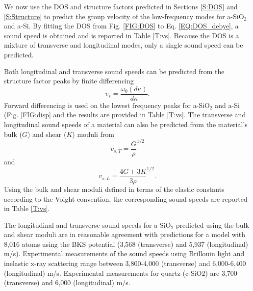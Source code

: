 \documentclass[aps,prb,onecolumn,preprint,superscriptaddress,footinbib,amsmath,amssymb,floatfix]{revtex4}
\begin{document}
We now use the DOS and structure factors predicted in 
Sections \ref{S:DOS} and \ref{S:Structure} to 
predict the group velocity of the low-frequency modes for 
a-SiO$_2$ and a-Si. By fitting the DOS 
from Fig. \ref{FIG:DOS} to Eq. \eqref{EQ:DOS_debye}, 
a sound speed is obtained and is  
reported in Table \ref{T:vs}. Because the DOS is a mixture of 
transverse and longitudinal modes, only a single sound speed can be 
predicted. 

Both longitudinal and transverse sound speeds can be predicted from 
the structure factor peaks by finite 
differencing 
\begin{equation}\label{EQ:vs_dwdk}
v_{s} = \frac{\omega_0(d\kappa)}{d\kappa}.
\end{equation}
Forward differencing is used on the lowest frequency peaks for a-SiO$_2$ 
and a-Si (Fig. \ref{FIG:disp} and the results are provided 
in Table \ref{T:vs}. 
The transverse and longitudinal sound speeds of a material can 
also be predicted from the material's bulk ($G$) and 
shear ($K$) moduli from 
\begin{equation}\label{EQ:vs_T_elas}
v_{s,T} = \frac{G}{\rho}^{1/2}
\end{equation}
and 
\begin{equation}\label{EQ:vs_L_elas}
v_{s,L} = \frac{4G + 3K}{3\rho}^{1/2}.
\end{equation}
Using the bulk and shear moduli defined in terms of the elastic 
constants according to the Voight convention,\cite{gale_general_2003}  
the corresponding sound speeds are reported in Table \ref{T:vs}. 

The longitudinal and transverse sound speeds for 
a-SiO$_2$ predicted using the bulk and shear moduli are in reasonable 
agreement with predictions for a model with 
8,016 atoms using the BKS potential 
(3,568 (transverse) and 5,937 (longitudinal) m/s).
\cite{horbach_high_2001} Experimental measurements of the 
sound speeds using Brillouin light and inelastic x-ray 
scattering range between 3,800-4,000 (transverse) and 
6,000-6,400 (longitudinal) m/s.
\cite{vacher_ultrasonic_1981,benassi_evidence_1996,
ruocco_high-frequency_2001,polian_elastic_2002,
ruzicka_evidence_2004} Experimental measurements for 
quartz (c-SiO2) are 3,700 (transverse) and 6,000 (longitudinal) 
m/s.\cite{touloukian_thermophysical_1970,kaviany_principles_2001}
\end{document}
